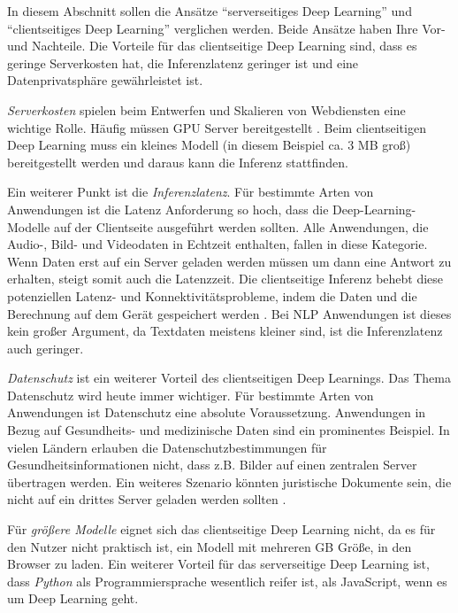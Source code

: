 In diesem Abschnitt sollen die Ansätze \enquote{serverseitiges Deep Learning} und \enquote{clientseitiges Deep Learning} verglichen werden. Beide Ansätze haben Ihre Vor- und Nachteile. Die Vorteile für das clientseitige Deep Learning sind, dass es geringe Serverkosten hat, die Inferenzlatenz geringer ist und eine Datenprivatsphäre gewährleistet ist. 

\textit{Serverkosten} spielen beim Entwerfen und Skalieren von Webdiensten eine wichtige Rolle. Häufig müssen GPU Server bereitgestellt  \cite[19]{cai2020deep}. Beim clientseitigen Deep Learning muss ein kleines Modell (in diesem Beispiel ca. 3 MB groß) bereitgestellt werden und daraus kann die Inferenz stattfinden.

Ein weiterer Punkt ist die \textit{Inferenzlatenz}. Für bestimmte Arten von Anwendungen ist die Latenz Anforderung so hoch, dass die Deep-Learning-Modelle auf der Clientseite ausgeführt werden sollten. Alle Anwendungen, die Audio-, Bild- und Videodaten in Echtzeit enthalten, fallen in diese Kategorie. Wenn Daten erst auf ein Server geladen werden müssen um dann eine Antwort zu erhalten, steigt somit auch die Latenzzeit. Die clientseitige Inferenz behebt diese potenziellen Latenz- und Konnektivitätsprobleme, indem die Daten und die Berechnung auf dem Gerät gespeichert werden \cite[20]{cai2020deep}. Bei NLP Anwendungen ist dieses kein großer Argument, da Textdaten meistens kleiner sind, ist die Inferenzlatenz auch geringer.

\textit{Datenschutz} ist ein weiterer Vorteil des clientseitigen Deep Learnings. Das Thema Datenschutz wird heute immer wichtiger. Für bestimmte Arten von Anwendungen ist Datenschutz eine absolute Voraussetzung. Anwendungen in Bezug auf Gesundheits- und medizinische Daten sind ein prominentes Beispiel. In vielen Ländern erlauben die Datenschutzbestimmungen für Gesundheitsinformationen nicht, dass z.B. Bilder auf einen zentralen Server übertragen werden. Ein weiteres Szenario könnten juristische Dokumente sein, die nicht auf ein drittes Server geladen werden sollten \cite[20]{cai2020deep}. 

Für \textit{größere Modelle} eignet sich das clientseitige Deep Learning nicht, da es für den Nutzer nicht praktisch ist, ein Modell mit mehreren GB Größe, in den Browser zu laden. Ein weiterer Vorteil für das serverseitige Deep Learning ist, dass \textit{Python} als Programmiersprache wesentlich reifer ist, als JavaScript, wenn es um Deep Learning geht. 